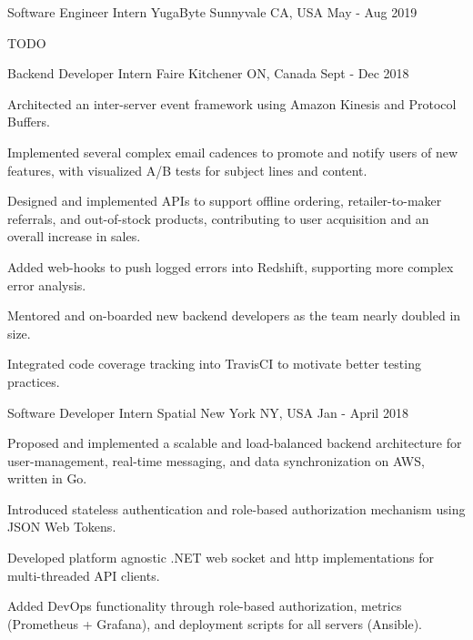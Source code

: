 
\begin{cventries}

\cventry
    {Software Engineer Intern}
    {YugaByte}
    {Sunnyvale CA, USA}
    {May - Aug 2019}
    {
      \begin{cvitems}
        \item TODO
      \end{cvitems}
    }

\cventry
    {Backend Developer Intern}
    {Faire}
    {Kitchener ON, Canada}
    {Sept - Dec 2018}
    {
      \begin{cvitems}
        \item Architected an inter-server event framework using Amazon Kinesis and Protocol Buffers.
        \item Implemented several complex email cadences to promote and notify users of new features,
        with visualized A/B tests for subject lines and content.
        \item Designed and implemented APIs to support offline ordering, retailer-to-maker referrals,
        and out-of-stock products, contributing to user acquisition and an overall increase in sales.
        \item Added web-hooks to push logged errors into Redshift, supporting more complex error analysis.
        \item Mentored and on-boarded new backend developers as the team nearly doubled in size.
        \item Integrated code coverage tracking into TravisCI to motivate better testing practices.
      \end{cvitems}
    }
    
\cventry
    {Software Developer Intern}
    {Spatial}
    {New York NY, USA}
    {Jan - April 2018}
    {
      \begin{cvitems}
        \item Proposed and implemented a scalable and load-balanced backend architecture for user-management,
        real-time messaging, and data synchronization on AWS, written in Go.
        \item Introduced stateless authentication and role-based authorization mechanism using JSON Web Tokens.
        \item Developed platform agnostic .NET web socket and http implementations for multi-threaded API clients.
        \item Added DevOps functionality through role-based authorization, metrics (Prometheus + Grafana),
        and deployment scripts for all servers (Ansible).
      \end{cvitems}
    }
    

\end{cventries}
